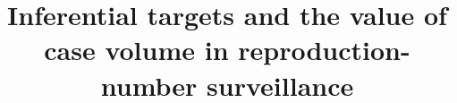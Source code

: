 \documentclass[authoryear,preprint,10pt,fleqn]{elsarticle}
\theoremstyle{remark}\newtheorem{remark}{Remark}
\begin{document}
\begin{frontmatter}
\title{Inferential targets and the value of case volume in reproduction-number surveillance}

\end{frontmatter}







\FloatBarrier


\FloatBarrier

\end{document}
